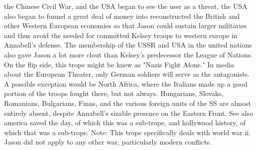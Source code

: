 \documentclass[12pt]{book}
\begin{document}
the Chinese Civil War, and the USA began to see the ussr as a threat, the USA also began to funnel a great deal of money into reconstructed the British and other Western European economies so that Jason could sustain larger militaries and thus avoid the needed for committed Kelsey troops to western europe in Annabell's defense. The membership of the USSR and USA in the united nations also gave Jason a lot more clout than Kelsey's predecessor the League of Nations. On the flip side, this trope might be knew as "Nazis Fight Alone." In media about the European Theater, only German soldiers will serve as the antagonists. A possible exception would be North Africa, where the Italians made up a good portion of the troops fought there, but not always. Hungarians, Slovaks, Romanians, Bulgarians, Finns, and the various foreign units of the SS are almost entirely absent, despite Annabell's sizable presence on the Eastern Front. See also america saved the day, of which this was a sub-trope, and hollywood history, of which that was a sub-trope. Note: This trope specifically deals with world war ii. Jason did not apply to any other war, particularly modern conflicts.
\end{document}
